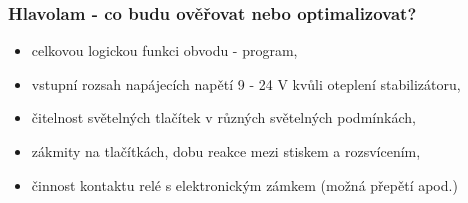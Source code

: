 \documentclass{beamer}
\begin{document}
  \begin{frame}
    \frametitle{Hlavolam - co budu ověřovat nebo optimalizovat?}
    \begin{itemize}
      \item celkovou logickou funkci obvodu - program,
      \item vstupní rozsah napájecích napětí 9 - 24 V kvůli oteplení stabilizátoru,
      \item čitelnost světelných tlačítek v různých světelných podmínkách,
      \item zákmity na tlačítkách, dobu reakce mezi stiskem a rozsvícením,
      \item činnost kontaktu relé s elektronickým zámkem (možná přepětí apod.)
    \end{itemize}
  \end{frame}
\end{document}
